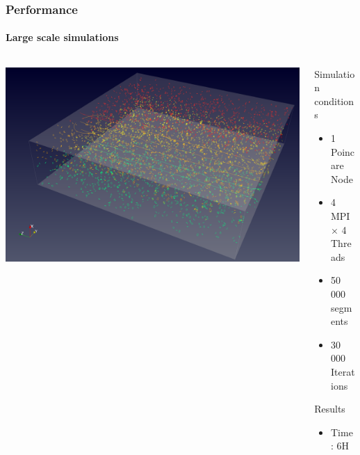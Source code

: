 \documentclass[aspectratio=1610,t,10pt]{beamer}
\begin{document}
\begin{frame}
\frametitle{Performance}
\framesubtitle{Large scale simulations}
\begin{columns}[c]
    \begin{column}{.68\textwidth}
        \includegraphics[width=\linewidth]{img/prismaticglide/prismaticglide-5.png}
    \end{column}
    \begin{column}{.28\textwidth}
        \begin{block}{Simulation conditions}
            \begin{itemize}
                \item 1 Poincare Node
                \item 4 MPI $\times$ 4 Threads
                \item 50 000 segments
                \item 30 000 Iterations
            \end{itemize}
        \end{block}
        \begin{block}{Results}
            \begin{itemize}
                
                \item Time : 6H
            \end{itemize}
        \end{block}        
    \end{column}
\end{columns}
\end{frame}
\end{document}
